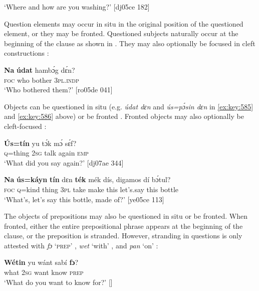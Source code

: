 \glt ‘Where and how are you washing?’ [dj05ce 182]
\z

Question elements may occur in situ in the original position of the questioned element, or they may be fronted. Questioned subjects naturally occur at the beginning of the clause as shown in . They may also optionally be focused in cleft constructions : 


\ea%
    \label{ex:key:591}
    \gll \textbf{Na}  \textbf{údat}  hambɔ́g  dɛ́n?\\
\textsc{foc}  who    bother  \textsc{3pl.indp}\\

\glt ‘Who bothered them?’ [ro05de 041]
\z

Objects can be questioned in situ (e.g. \textit{údat dɛn} and \textit{ús=pɔ́sin dɛn} in \ref{ex:key:585} and \ref{ex:key:586} above) or be fronted . Fronted objects may also optionally be cleft-focused :


\ea%
    \label{ex:key:592}
    \gll \textbf{\'{U}s=tín}    yu  tɔ́k  mɔ́    sɛ́f?\\
{\textsc{q}=thing}  \textsc{2sg}  talk  again  \textsc{emp}\\

\glt ‘What did you say again?’ [dj07ae 344]
\z


\ea%
    \label{ex:key:593}
    \gll \textbf{Na}  \textbf{ús=káyn}  \textbf{tín}    dɛn  \textbf{ték}    mék    dís,  digamos  dí  bɔ́tul?\\
\textsc{foc}  \textsc{q}=kind  thing  \textsc{3pl}  take    make  this  let’s.say  this  bottle\\

\glt ‘What’s, let’s say this bottle, made of?’ [ye05ce 113]
\z

The objects of prepositions may also be questioned in situ or be fronted. When fronted, either the entire prepositional phrase appears at the beginning of the clause, or the preposition is stranded. However, stranding in questions is only attested with \textit{fɔ} ‘\textsc{prep}’ , \textit{wet} ‘with’ , and \textit{pan} ‘on’ :


\ea%
    \label{ex:key:594}
    \gll \textbf{Wétin}  yu  wánt  sabí    \textbf{fɔ}?\\
what  \textsc{2sg}  want  know  \textsc{prep}\\

\glt ‘What do you want to know for?’ []
\z


